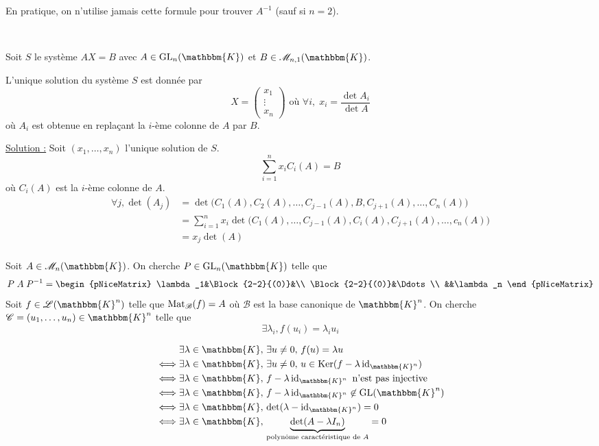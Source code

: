 \begin{rmk}
	En pratique, on n'utilise jamais cette formule pour trouver $A^{-1}$ (sauf si $n = 2$).
\end{rmk}

\begin{exo}~

	Soit $S$ le système $AX = B$ avec $A \in \mathrm{GL}_n(\mathbbm{K})$ et $B \in \mathcal{M}_{n,1}(\mathbbm{K})$.

	L'unique solution du système $S$ est donnée par \[
		X = \begin{pmatrix}
			x_1\\\vdots\\x_n
		\end{pmatrix} \text{ où } \forall i,\; x_i = \frac{\det A_i}{\det A}
	\] où $A_i$ est obtenue en replaçant la $i$-ème colonne de $A$ par $B$.

	\underline{Solution :} Soit $(x_1, \ldots, x_n)$ l'unique solution de $S$. \[
		\sum_{i=1}^n x_i C_i(A) = B
	\] où $C_i(A)$ est la $i$-ème colonne de $A$.
	\begin{align*}
		\forall j, \det(A_j) &= \det\big(C_1(A), C_2(A), \ldots, C_{j-1}(A), B, C_{j+1}(A),\ldots, C_n(A)\big)\\
		&= \sum_{i=1}^n x_i \det\big(C_1(A), \ldots, C_{j-1}(A), C_i(A), C_{j+1}(A), \ldots, c_n(A)\big) \\
		&= x_j \det(A) \\
	\end{align*}
\end{exo}


Soit $A \in \mathcal{M}_n(\mathbbm{K})$. On cherche $P \in \mathrm{GL}_n(\mathbbm{K})$ telle que \[
	P\;A\;P^{-1} =
	\begin{pNiceMatrix}
		\lambda_1&\Block{2-2}{(0)}&\\
		\Block{2-2}{(0)}&\Ddots\\
		&&\lambda_n
	\end{pNiceMatrix}
\] Soit $f \in \mathcal{L}(\mathbbm{K}^n)$ telle que $\operatorname{Mat}_\mathcal{B}(f) = A$ où $\mathcal{B}$ est la base canonique de $\mathbbm{K}^n$. On cherche $\mathcal{C} = (u_1, \ldots, u_n) \in \mathbbm{K}^n$ telle que \[
	\exists \lambda_i, f(u_i) = \lambda_i u_i
\]

\begin{align*}
	&\exists \lambda \in \mathbbm{K},\,\exists u\neq 0,\,f(u) = \lambda u\\
	\iff & \exists \lambda \in \mathbbm{K},\,\exists u\neq 0,\, u \in \Ker(f - \lambda \id_{\mathbbm{K}^n})\\
	\iff & \exists \lambda \in \mathbbm{K},\,f-\lambda \id_{\mathbbm{K}^n} \text{ n'est pas injective}\\
	\iff & \exists \lambda \in \mathbbm{K},\, f - \lambda \id_{\mathbbm{K}^n} \not\in \mathrm{GL}(\mathbbm{K}^n)\\
	\iff & \exists \lambda \in \mathbbm{K},\, \det(\lambda - \id_{\mathbbm{K}^n}) = 0\\
	\iff & \exists \lambda \in \mathbbm{K},\,\underbrace{\det(A - \lambda I_n)}_{\text{polynôme caractéristique de $A$}} = 0
\end{align*}

